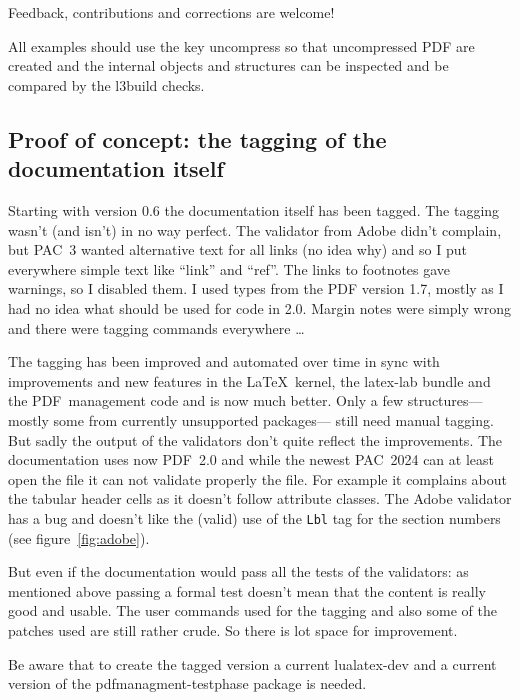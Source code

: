 \documentclass[bibliography=totoc,a4paper]{article}
\newcommand\PrintKeyName[1]{\textsf{#1}}
\newcommand\PDF{PDF}
\begin{document}
\begin{tcolorbox}
Feedback, contributions and corrections are welcome!
\end{tcolorbox}


All examples should use the  key \PrintKeyName{uncompress}
so that uncompressed \PDF{} are created and the internal objects and 
structures can be inspected and be compared by the l3build checks.%



\subsection{Proof of concept: the tagging of the documentation itself}

Starting with version 0.6 the documentation itself has been tagged. The 
tagging wasn't (and isn't) in no way perfect. The validator from Adobe didn't 
complain, but PAC~3 wanted alternative text for all links (no idea why) and 
so I put everywhere simple text like \enquote{link} and \enquote{ref}. The 
links to footnotes gave warnings, so I disabled them. I used types from the 
\PDF{} version 1.7, mostly as I had no idea what should be used for code in 
2.0. Margin notes were simply wrong and there were tagging commands 
everywhere \ldots 

The tagging has been improved and automated over time in sync with 
improvements and new features in the \LaTeX\ kernel, the latex-lab bundle and 
the \PDF\ management code and is now much better. Only a few 
structures---mostly some from currently unsupported packages--- still need 
manual tagging. But sadly the output of the validators don't quite reflect 
the improvements. The documentation uses now \PDF~2.0  and while the newest 
PAC~2024 can at least open the file it can not validate properly the file. For example
it complains about the tabular header cells as it doesn't follow attribute classes.
The Adobe validator has a bug and 
doesn't like the (valid) use of  the \texttt{Lbl} tag for the section numbers 
(see figure~\ref{fig:adobe}).  


But even if the documentation would pass all the tests of the validators:  as 
mentioned above passing a formal test doesn't mean that the content is really 
good and usable. The user commands used for the tagging and also some of the 
patches used are still rather crude. So there is lot space for improvement. 

\begin{tcolorbox}[]
Be aware that to create the tagged version a current lualatex-dev and a 
current version of the pdfmanagment-testphase package is needed. 
\end{tcolorbox}
\end{document}
